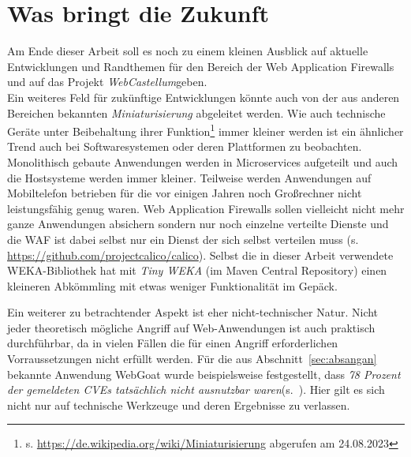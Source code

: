 \section{Was bringt die Zukunft}

Am Ende dieser Arbeit soll es noch zu einem kleinen Ausblick auf aktuelle Entwicklungen und Randthemen für den Bereich der Web Application Firewalls und auf das Projekt \glqq\emph{WebCastellum}\grqq geben.\\


Ein weiteres Feld für zukünftige Entwicklungen könnte auch von der aus anderen Bereichen bekannten \emph{Miniaturisierung} abgeleitet werden. Wie auch technische Geräte unter Beibehaltung ihrer Funktion\footnote{s. \url{https://de.wikipedia.org/wiki/Miniaturisierung} abgerufen am 24.08.2023} immer kleiner werden ist ein ähnlicher Trend auch bei Softwaresystemen oder deren Plattformen zu beobachten. Monolithisch gebaute Anwendungen werden in Microservices aufgeteilt und auch die Hostsysteme werden immer kleiner. Teilweise werden Anwendungen auf Mobiltelefon betrieben für die vor einigen Jahren noch Großrechner nicht leistungsfähig genug waren. Web Application Firewalls sollen vielleicht nicht mehr ganze Anwendungen absichern sondern nur noch einzelne verteilte Dienste und die WAF ist dabei selbst nur ein Dienst der sich selbst verteilen muss (s. \url{https://github.com/projectcalico/calico}). Selbst die in dieser Arbeit verwendete WEKA-Bibliothek hat mit \emph{Tiny WEKA} (im Maven Central Repository) einen kleineren Abkömmling mit etwas weniger Funktionalität im Gepäck. 


Ein weiterer zu betrachtender Aspekt ist eher nicht-technischer Natur. Nicht jeder theoretisch mögliche Angriff auf Web-Anwendungen ist auch praktisch durchführbar, da in vielen Fällen die für einen Angriff erforderlichen Vorraussetzungen nicht erfüllt werden. Für die aus Abschnitt~\ref{sec:absangan} bekannte Anwendung WebGoat wurde beispielsweise festgestellt, dass \glqq\emph{78 Prozent der gemeldeten CVEs tatsächlich nicht ausnutzbar waren}\grqq (s.~\cite{lueck23}). Hier gilt es sich nicht nur auf technische Werkzeuge und deren Ergebnisse zu verlassen.


